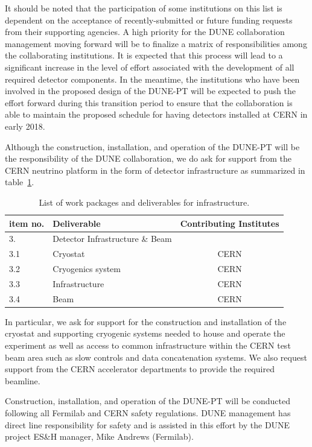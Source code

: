%
 It should be noted that the participation of some institutions on this list is dependent on 
the acceptance of recently-submitted or future funding requests from their supporting agencies.  A high priority for the DUNE 
collaboration management moving forward will be to finalize a matrix of responsibilities among the collaborating institutions.  It 
is expected that this process will lead to a significant increase in the level of effort associated with the development of all 
required detector components.  In the meantime, the institutions who have been involved in the proposed design of the DUNE-PT
will be expected to push the effort forward during this transition period to ensure that the collaboration is able to maintain the 
proposed schedule for having detectors installed at CERN in early 2018.

Although the construction, installation, and operation of the DUNE-PT will be the responsibility of the DUNE collaboration, we do 
ask for support from the CERN neutrino platform in the form of detector infrastructure as summarized in table~\ref{tab:wbs-infra}.  
%
\begin{table}[h]
\centering
\begin{tabular}{|l l c|}
\hline
\textbf{item no. } & \textbf{Deliverable}  & \textbf{Contributing Institutes}  \\ \hline

3.   & Detector Infrastructure \& Beam & \\
3.1  & Cryostat &  CERN \\
3.2  & Cryogenics system   &  CERN \\
3.3  & Infrastructure  & CERN \\ 
3.4 & Beam & CERN \\ \hline

\end{tabular}
\caption{List of work packages and deliverables for infrastructure.} 
\label{tab:wbs-infra}
\end{table}
%
In particular, we ask for support for the 
construction and installation of the cryostat and supporting cryogenic systems needed to house and operate the experiment as well 
as access to common infrastructure within the CERN test beam area such as slow controls and data concatenation systems.  We also 
request support from the CERN accelerator departments to provide the required beamline.

Construction, installation, and operation of the DUNE-PT will be conducted following all Fermilab and CERN safety regulations.  
DUNE management has direct line responsibility for safety and is assisted in this effort by the DUNE project ES\&H manager, 
Mike Andrews (Fermilab). 
              
